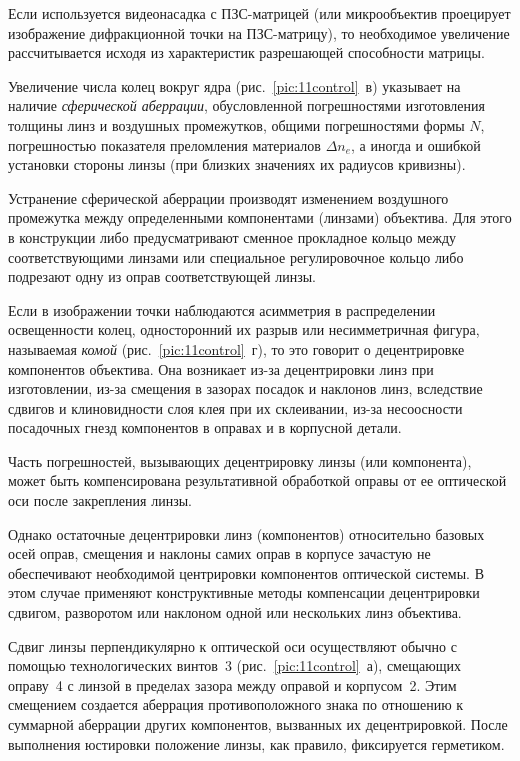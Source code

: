 Если используется видеонасадка с ПЗС-матрицей (или микрообъектив проецирует изображение дифракционной точки на ПЗС-матрицу), то необходимое увеличение рассчитывается исходя из характеристик разрешающей способности матрицы.

Увеличение числа колец вокруг ядра (рис.~\ref{pic:11control}~в) указывает на наличие \textit{сферической аберрации}, обусловленной погрешностями изготовления толщины линз и воздушных промежутков, общими погрешностями формы $ N $, погрешностью показателя преломления материалов $ \Delta n_e $, а иногда и ошибкой установки стороны линзы (при близких значениях их радиусов кривизны).

Устранение сферической аберрации производят изменением воздушного промежутка между определенными компонентами (линзами) объектива. Для этого в конструкции либо предусматривают сменное прокладное кольцо между соответствующими линзами или специальное регулировочное кольцо либо подрезают одну из оправ соответствующей линзы.

Если в изображении точки наблюдаются асимметрия в распределении освещенности колец, односторонний их разрыв или несимметричная фигура, называемая \textit{комой} (рис.~\ref{pic:11control}~г), то это говорит о децентрировке компонентов объектива. Она возникает из-за децентрировки линз при изготовлении, из-за смещения в зазорах посадок и наклонов линз, вследствие сдвигов и клиновидности слоя клея при их склеивании, из-за несоосности посадочных гнезд компонентов в оправах и в корпусной детали.

Часть погрешностей, вызывающих децентрировку линзы (или компонента), может быть компенсирована результативной обработкой оправы от ее оптической оси после закрепления линзы.

Однако остаточные децентрировки линз (компонентов) относительно базовых осей оправ, смещения и наклоны самих оправ в корпусе зачастую не обеспечивают необходимой центрировки компонентов оптической системы. В этом случае применяют конструктивные методы компенсации децентрировки сдвигом, разворотом или наклоном одной или нескольких линз объектива.

Сдвиг линзы перпендикулярно к оптической оси осуществляют обычно с помощью технологических винтов~3 (рис.~\ref{pic:11control}~а), смещающих оправу~4 с линзой в пределах зазора между оправой и корпусом~2. Этим смещением создается аберрация противоположного знака по отношению к суммарной аберрации других компонентов, вызванных их децентрировкой. После выполнения юстировки положение линзы, как правило, фиксируется герметиком.


